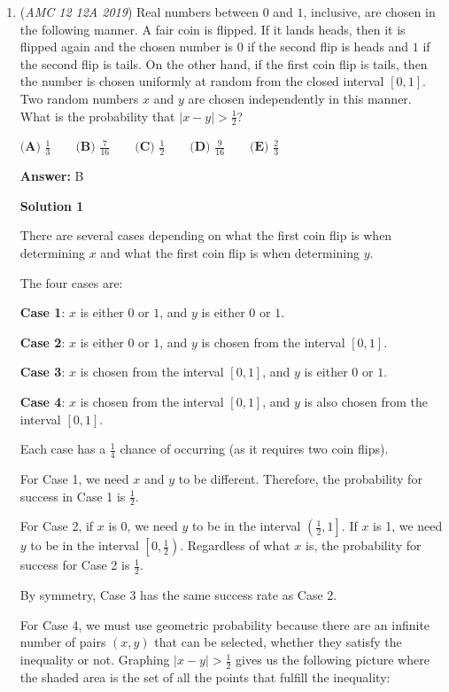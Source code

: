 \begin{enumerate}
	\item (\textit{AMC 12 12A 2019}) Real numbers between $0$ and $1$, inclusive, are chosen in the following manner. A fair coin is flipped. If it lands heads, then it is flipped again and the chosen number is $0$ if the second flip is heads and $1$ if the second flip is tails. On the other hand, if the first coin flip is tails, then the number is chosen uniformly at random from the closed interval $[0,1]$. Two random numbers $x$ and $y$ are chosen independently in this manner. What is the probability that $|x-y| > \frac{1}{2}$?


 $\textbf{(A) } \frac{1}{3} \qquad \textbf{(B) } \frac{7}{16} \qquad \textbf{(C) } \frac{1}{2} \qquad \textbf{(D) } \frac{9}{16} \qquad \textbf{(E) } \frac{2}{3}$

 \textbf{Answer: }B



\textbf{Solution 1}

There are several cases depending on what the first coin flip is when determining $x$ and what the first coin flip is when determining $y$.

 The four cases are:

 \textbf{Case 1}: $x$ is either $0$ or $1$, and $y$ is either $0$ or $1$.

 \textbf{Case 2}: $x$ is either $0$ or $1$, and $y$ is chosen from the interval $[0,1]$.

 \textbf{Case 3}: $x$ is chosen from the interval $[0,1]$, and $y$ is either $0$ or $1$.

 \textbf{Case 4}: $x$ is chosen from the interval $[0,1]$, and $y$ is also chosen from the interval $[0,1]$.

 Each case has a $\frac{1}{4}$ chance of occurring (as it requires two coin flips).

 For Case 1, we need $x$ and $y$ to be different. Therefore, the probability for success in Case 1 is $\frac{1}{2}$.

 For Case 2, if $x$ is 0, we need $y$ to be in the interval $\left(\frac{1}{2}, 1\right]$. If $x$ is 1, we need $y$ to be in the interval $\left[0, \frac{1}{2}\right)$. Regardless of what $x$ is, the probability for success for Case 2 is $\frac{1}{2}$.

 By symmetry, Case 3 has the same success rate as Case 2.

 For Case 4, we must use geometric probability because there are an infinite number of pairs $(x, y)$ that can be selected, whether they satisfy the inequality or not. Graphing $|x-y| > \frac{1}{2}$ gives us the following picture where the shaded area is the set of all the points that fulfill the inequality:


\end{enumerate}
